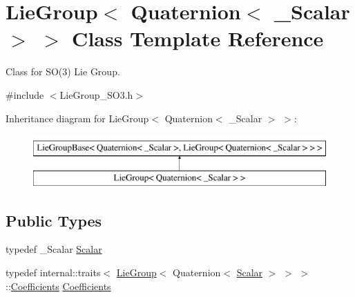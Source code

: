 \hypertarget{class_lie_group_3_01_quaternion_3_01___scalar_01_4_01_4}{}\section{Lie\+Group$<$ Quaternion$<$ \+\_\+\+Scalar $>$ $>$ Class Template Reference}
\label{class_lie_group_3_01_quaternion_3_01___scalar_01_4_01_4}


Class for S\+O(3) Lie Group.  




{\ttfamily \#include $<$Lie\+Group\+\_\+\+S\+O3.\+h$>$}

Inheritance diagram for Lie\+Group$<$ Quaternion$<$ \+\_\+\+Scalar $>$ $>$\+:\begin{figure}[H]
\begin{center}
\leavevmode
\includegraphics[height=2.000000cm]{class_lie_group_3_01_quaternion_3_01___scalar_01_4_01_4}
\end{center}
\end{figure}
\subsection*{Public Types}
\begin{DoxyCompactItemize}
\item 
typedef \+\_\+\+Scalar \hyperlink{class_lie_group_3_01_quaternion_3_01___scalar_01_4_01_4_a5c9cc4f61c2a1870f44da7951225dc4e}{Scalar}
\item 
typedef internal\+::traits$<$ \hyperlink{class_lie_group}{Lie\+Group}$<$ Quaternion$<$ \hyperlink{class_lie_group_3_01_quaternion_3_01___scalar_01_4_01_4_a5c9cc4f61c2a1870f44da7951225dc4e}{Scalar} $>$ $>$ $>$\+::\hyperlink{class_lie_group_3_01_quaternion_3_01___scalar_01_4_01_4_a80504cfb3bcbf55c7d4c1e377ef9f782}{Coefficients} \hyperlink{class_lie_group_3_01_quaternion_3_01___scalar_01_4_01_4_a80504cfb3bcbf55c7d4c1e377ef9f782}{Coefficients}
\end{DoxyCompactItemize}

